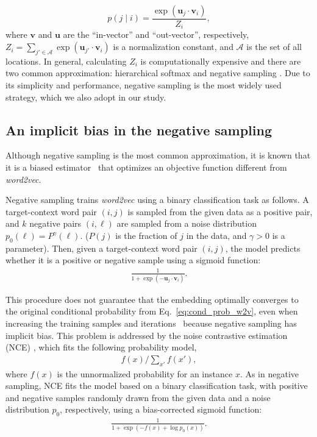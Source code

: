 \documentclass[12pt,a4paper]{article}
\def\given{\mid}
\begin{document}
%
%
\begin{equation}
	p(j \given i) = \frac{\exp(\bm{u}_j \cdot \bm{v}_{i})}{Z_i}, \label{eq:cond_prob_w2v}
\end{equation}
where $\bm{v}$ and $\bm{u}$ are the ``in-vector'' and ``out-vector'', respectively,  $Z_i=\sum_{j' \in \mathcal{A}} \exp(\bm{u}_{j'} \cdot \bm{v}_{i})$ is a normalization constant, and $\mathcal{A}$ is the set of all locations. In general, calculating $Z_i$ is computationally expensive and there are two common approximation:
hierarchical softmax \autocite{morin2005hierarchical} and negative sampling \autocite{mikolov2013word2vec}.
Due to its simplicity and performance, negative sampling is the most widely used strategy, which we also adopt in our study. 


\subsection{An implicit bias in the negative sampling}
Although negative sampling is the most common approximation, it is known that it is a biased estimator~\autocite{Chia2010,Dyer2014} that optimizes an objective function different from {\it word2vec}.

Negative sampling trains {\it word2vec} using a binary classification task as follows.
A target-context word pair $(i,j)$ is sampled from the given data as a positive pair, and $k$ negative pairs $(i,\ell)$ are sampled from a noise distribution $p_0(\ell)=P^\gamma(\ell)$. ($P(j)$ is the fraction of $j$ in the data, and $\gamma>0$ is a parameter).
Then, given a target-context word pair $(i,j)$, the model predicts whether it is a positive or negative sample using a sigmoid function:
\begin{align}
	\label{eq:sigmoid}
	\frac{1}{1 + \exp\left( - \bm{u}_j \cdot \bm{v}_i \right)}.
\end{align}

This procedure does not guarantee that the embedding optimally converges to the original conditional probability from Eq.~\ref{eq:cond_prob_w2v}, even when increasing the training samples and iterations~\autocite{Chia2010,Dyer2014} because negative sampling has implicit bias.
This problem is addressed by the noise contrastive estimation (NCE) \autocite{Chia2010}, which fits the following probability model,
\begin{align}
	\label{eq:nce}
	f(x) / \sum_{x'} f(x'),
\end{align}
where $f(x)$ is the unnormalized probability for an instance $x$. As in negative sampling, NCE fits the model based on a binary classification task, with positive and negative samples randomly drawn from the given data and a noise distribution $p_0$, respectively, using a bias-corrected sigmoid function:
\begin{align}
	\label{eq:sigmoid2}
	\frac{1}{1 + \exp\left( -f(x) + \log p_0(x) \right)}.
\end{align}
\end{document}
